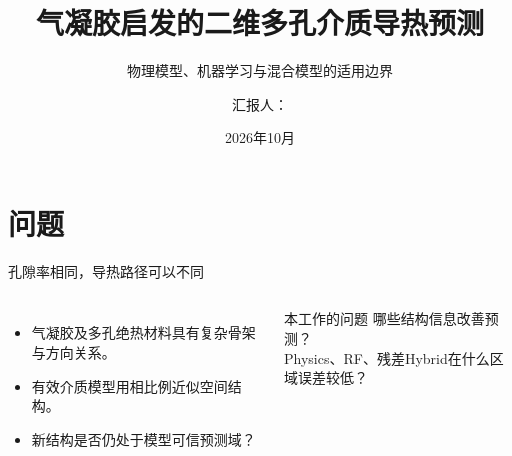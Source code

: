 \documentclass[10pt,aspectratio=169]{beamer}
\title[二维多孔导热]{气凝胶启发的二维多孔介质导热预测}
\subtitle{物理模型、机器学习与混合模型的适用边界}
\author[课程汇报]{汇报人：\underline{\hspace{2cm}}}
\institute[化工学院]{化学工程与生物工程学院\\浙江大学}
\date[2026年10月]{2026年10月}
\newcommand{\source}[1]{\par\vspace{1mm}{\scriptsize #1}}
\begin{document}
\begin{frame}\titlepage\end{frame}
\section{问题}
\begin{frame}{孔隙率相同，导热路径可以不同}
\begin{columns}[T]
\begin{itemize}
\item 气凝胶及多孔绝热材料具有复杂骨架与方向关系\cite{abraham2023,wei2020}。
\item 有效介质模型用相比例近似空间结构。
\item 新结构是否仍处于模型可信预测域？
\end{itemize}
\begin{block}{本工作的问题}
哪些结构信息改善预测？\\[2mm]
Physics、RF、残差Hybrid在什么区域误差较低？
\end{block}
\end{columns}
\source{研究对象：合成二维复杂多孔结构；不是实验气凝胶微结构。}
\end{frame}
\end{document}
